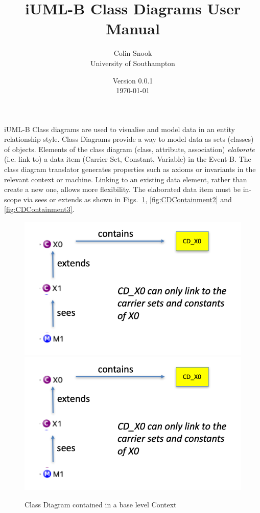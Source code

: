 \documentclass[a4paper,10pt]{article}
\title{iUML-B Class Diagrams User Manual}
\author{Colin Snook\\University of Southampton}
\date{%
	Version 0.0.1\\%
	\today%
}
\begin{document}
	\ifplastex%
	\maketitle%
	\else%
	\ifstandalone%
	\maketitle %
	\else%
	\fi%
	\fi%
	
iUML-B Class diagrams are used to visualise and model data in an entity relationship style.
Class Diagrams provide a way to model data as sets (classes) of objects.
Elements of the class diagram (class, attribute, association) \emph{elaborate} (i.e. link to) a data item (Carrier Set, Constant, Variable) in the Event-B.
The class diagram translator generates properties such as axioms or invariants in the relevant context or machine.
Linking to an existing data element, rather than create a new one, allows more flexibility.
The elaborated data item must be in-scope via sees or extends as shown in Figs.~\ref{fig:CDContainment1}, \ref{fig:CDContainment2} and 	\ref{fig:CDContainment3}.
	
	\begin{figure}[!htbp]
		\centering
		\ifplastex
		\includegraphics[width=500]{figures/containment_1.png}
		\else
		\includegraphics[width=.5\textwidth]{figures/containment_1.png}
		\fi
		\caption{Class Diagram contained in a base level Context}
		\label{fig:CDContainment1}
	\end{figure}
	
\end{document}
